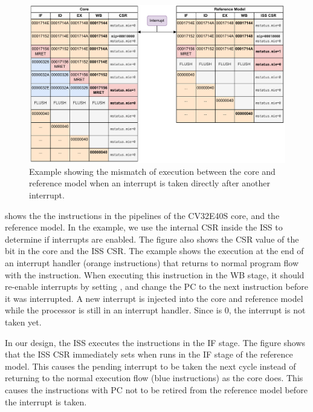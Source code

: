 \begin{figure}
    \centering
    \includegraphics[width=1\linewidth]{figures/mret_example_fail.pdf}
    \caption{Example showing the mismatch of execution between the core and reference model when an interrupt is taken directly after another interrupt.}
    \label{fig:mret_example_fail}
\end{figure}


 shows the the instructions in the pipelines of the CV32E40S core, and the reference model. In the example, we use the internal CSR inside the ISS to determine if interrupts are enabled. The figure also shows the CSR value of the  bit in the core and the ISS CSR. The example shows the execution at the end of an interrupt handler (orange instructions) that returns to normal program flow with the  instruction. When executing this instruction in the WB stage, it should re-enable interrupts by setting , and change the PC to the next instruction before it was interrupted. A new interrupt is injected into the core and reference model while the processor is still in an interrupt handler. Since  is 0, the interrupt is not taken yet. 

In our design, the ISS executes the instructions in the IF stage. The figure shows that the ISS CSR immediately sets  when  runs in the IF stage of the reference model. This causes the pending interrupt to be taken the next cycle instead of returning to the normal execution flow (blue instructions) as the core does. This causes the instructions with PC  not to be retired from the reference model before the interrupt is taken.





